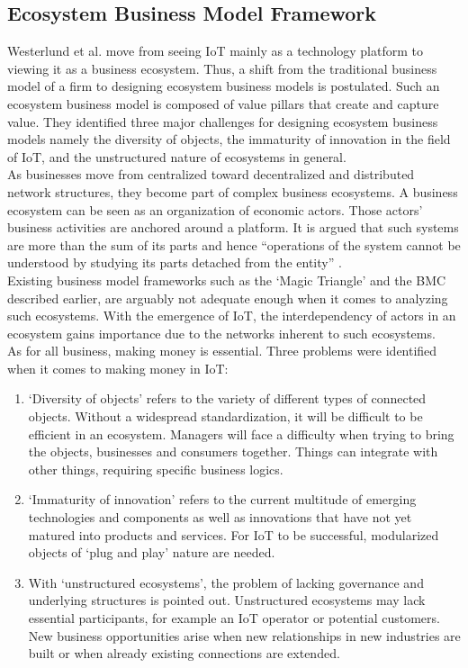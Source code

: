 	\subsection{Ecosystem Business Model Framework}
	\vspace{-1em}
		Westerlund et al. \cite{westerlund} move from seeing IoT mainly as a technology platform to viewing it as a business ecosystem. Thus, a shift from the traditional business model of a firm to designing ecosystem business models is postulated. Such an ecosystem business model is composed of value pillars that create and capture value. They identified three major challenges for designing ecosystem business models namely the diversity of objects, the immaturity of innovation in the field of IoT, and the unstructured nature of ecosystems in general.\\
		As businesses move from centralized toward decentralized and distributed network structures, they become part of complex business ecosystems. A business ecosystem can be seen as an organization of economic actors. Those actors' business activities are anchored around a platform. It is argued that such systems are more than the sum of its parts and hence ``operations of the system cannot be understood by studying its parts detached from the entity'' \cite{westerlund}.\\
		Existing business model frameworks such as the `Magic Triangle' and the BMC described earlier, are arguably not adequate enough when it comes to analyzing such ecosystems. With the emergence of IoT, the interdependency of actors in an ecosystem gains importance due to the networks inherent to such ecosystems.\\
		As for all business, making money is essential. Three problems were identified when it comes to making money in IoT:\\
		\vspace{-1em}
		\begin{enumerate}
			\item `Diversity of objects' refers to the variety of different types of connected objects. Without a widespread standardization, it will be difficult to be efficient in an ecosystem. Managers will face a difficulty when trying to bring the objects, businesses and consumers together. Things can integrate with other things, requiring specific business logics.

			\item `Immaturity of innovation' refers to the current multitude of emerging technologies and components as well as innovations that have not yet matured into products and services. For IoT to be successful, modularized objects of `plug and play' nature are needed.

			\item With `unstructured ecosystems', the problem of lacking governance and underlying structures is pointed out. Unstructured ecosystems may lack essential participants, for example an IoT operator or potential customers. New business opportunities arise when new relationships in new industries are built or when already existing connections are extended.
		\end{enumerate}
